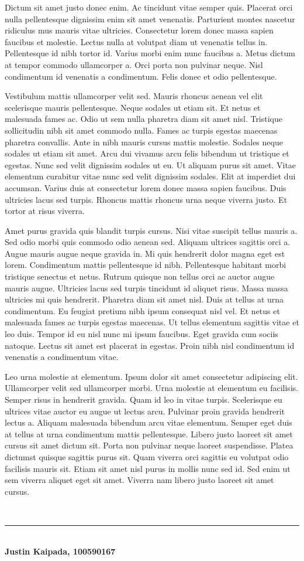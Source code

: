 \documentclass[10pt,landscape]{article}
\begin{document}
\begin{multicols}{3}
Dictum sit amet justo donec enim. Ac tincidunt vitae semper
quis. Placerat orci nulla pellentesque dignissim enim sit amet
venenatis. Parturient montes nascetur ridiculus mus mauris vitae
ultricies. Consectetur lorem donec massa sapien faucibus et
molestie. Lectus nulla at volutpat diam ut venenatis tellus
in. Pellentesque id nibh tortor id. Varius morbi enim nunc faucibus
a. Metus dictum at tempor commodo ullamcorper a. Orci porta non
pulvinar neque. Nisl condimentum id venenatis a condimentum. Felis
donec et odio pellentesque.

Vestibulum mattis ullamcorper velit sed. Mauris rhoncus aenean vel
elit scelerisque mauris pellentesque. Neque sodales ut etiam sit. Et
netus et malesuada fames ac. Odio ut sem nulla pharetra diam sit amet
nisl. Tristique sollicitudin nibh sit amet commodo nulla. Fames ac
turpis egestas maecenas pharetra convallis. Ante in nibh mauris cursus
mattis molestie. Sodales neque sodales ut etiam sit amet. Arcu dui
vivamus arcu felis bibendum ut tristique et egestas. Nunc sed velit
dignissim sodales ut eu. Ut aliquam purus sit amet. Vitae elementum
curabitur vitae nunc sed velit dignissim sodales. Elit at imperdiet
dui accumsan. Varius duis at consectetur lorem donec massa sapien
faucibus. Duis ultricies lacus sed turpis. Rhoncus mattis rhoncus urna
neque viverra justo. Et tortor at risus viverra.

Amet purus gravida quis blandit turpis cursus. Nisi vitae suscipit
tellus mauris a. Sed odio morbi quis commodo odio aenean sed. Aliquam
ultrices sagittis orci a. Augue mauris augue neque gravida in. Mi quis
hendrerit dolor magna eget est lorem. Condimentum mattis pellentesque
id nibh. Pellentesque habitant morbi tristique senectus et
netus. Rutrum quisque non tellus orci ac auctor augue mauris
augue. Ultricies lacus sed turpis tincidunt id aliquet risus. Massa
massa ultricies mi quis hendrerit. Pharetra diam sit amet nisl. Duis
at tellus at urna condimentum. Eu feugiat pretium nibh ipsum consequat
nisl vel. Et netus et malesuada fames ac turpis egestas maecenas. Ut
tellus elementum sagittis vitae et leo duis. Tempor id eu nisl nunc mi
ipsum faucibus. Eget gravida cum sociis natoque. Lectus sit amet est
placerat in egestas. Proin nibh nisl condimentum id venenatis a
condimentum vitae.

Leo urna molestie at elementum. Ipsum dolor sit amet consectetur
adipiscing elit. Ullamcorper velit sed ullamcorper morbi. Urna
molestie at elementum eu facilisis. Semper risus in hendrerit
gravida. Quam id leo in vitae turpis. Scelerisque eu ultrices vitae
auctor eu augue ut lectus arcu. Pulvinar proin gravida hendrerit
lectus a. Aliquam malesuada bibendum arcu vitae elementum. Semper eget
duis at tellus at urna condimentum mattis pellentesque. Libero justo
laoreet sit amet cursus sit amet dictum sit. Porta non pulvinar neque
laoreet suspendisse. Platea dictumst quisque sagittis purus sit. Quam
viverra orci sagittis eu volutpat odio facilisis mauris sit. Etiam sit
amet nisl purus in mollis nunc sed id. Sed enim ut sem viverra aliquet
eget sit amet. Viverra nam libero justo laoreet sit amet cursus.

~\\

\vfill
\hrule
~\\
\large{\textbf{Justin Kaipada, 100590167}}
\end{multicols}
\end{document}

